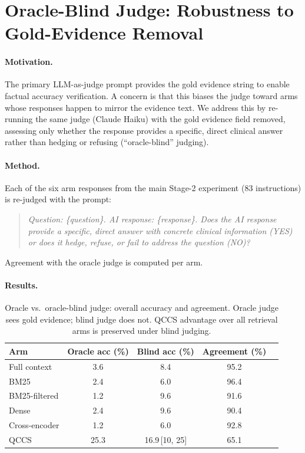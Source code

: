 \documentclass{article}
\begin{document}

\section{Oracle-Blind Judge: Robustness to Gold-Evidence Removal}
\label{app:blindjudge}

\paragraph{Motivation.}
The primary LLM-as-judge prompt provides the gold evidence string to enable factual
accuracy verification. A concern is that this biases the judge toward arms whose
responses happen to mirror the evidence text. We address this by re-running the
same judge (Claude Haiku) with the gold evidence field removed, assessing only
whether the response provides a specific, direct clinical answer rather than
hedging or refusing (``oracle-blind'' judging).

\paragraph{Method.}
Each of the six arm responses from the main Stage-2 experiment (83 instructions)
is re-judged with the prompt:
\begin{quote}\small
\textit{Question: \{question\}. AI response: \{response\}. Does the AI response
provide a specific, direct answer with concrete clinical information (YES) or does
it hedge, refuse, or fail to address the question (NO)?}
\end{quote}
Agreement with the oracle judge is computed per arm.

\paragraph{Results.}

\begin{table}[H]
\centering
\caption{Oracle vs.\ oracle-blind judge: overall accuracy and agreement.
  Oracle judge sees gold evidence; blind judge does not.
  QCCS advantage over all retrieval arms is preserved under blind judging.}
\label{tab:blindjudge}
\small
\begin{tabular}{@{}lcccc@{}}
\toprule
Arm & Oracle acc (\%) & Blind acc (\%) & Agreement (\%) \\
\midrule
Full context  & 3.6 &  8.4 & 95.2 \\
BM25          & 2.4 &  6.0 & 96.4 \\
BM25-filtered & 1.2 &  9.6 & 91.6 \\
Dense         & 2.4 &  9.6 & 90.4 \\
Cross-encoder & 1.2 &  6.0 & 92.8 \\
QCCS          & 25.3 & 16.9\,[10, 25] & 65.1 \\
\bottomrule
\end{tabular}
\end{table}
\end{document}
